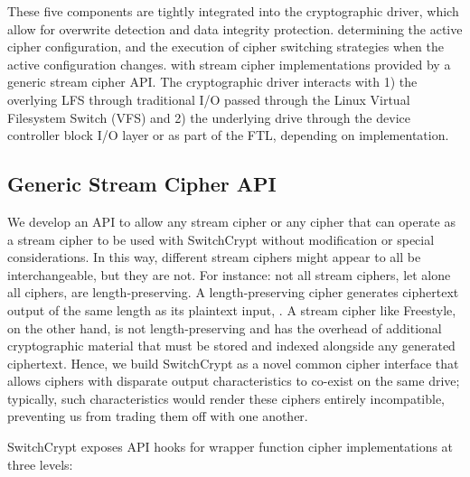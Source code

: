 These five components are tightly integrated into the cryptographic driver,
which allow for overwrite detection and data integrity protection. determining
the active cipher configuration, and the execution of cipher switching
strategies when the active configuration changes. with stream cipher
implementations provided by a generic stream cipher API. The cryptographic
driver interacts with 1) the overlying LFS through traditional I/O passed
through the Linux Virtual Filesystem Switch (VFS) and 2) the underlying drive
through the device controller block I/O layer or as part of the FTL, depending
on implementation.

\subsection{Generic Stream Cipher API}

We develop an API to allow any stream cipher or any cipher that can operate as a
stream cipher to be used with SwitchCrypt without modification or special
considerations. In this way, different stream ciphers might appear to all be
interchangeable, but they are not. For instance: not all stream ciphers, let
alone all ciphers, are length-preserving. A length-preserving cipher generates
ciphertext output of the same length as its plaintext input, . A
stream cipher like Freestyle, on the other hand, is not length-preserving and has the
overhead of additional cryptographic material that must be stored and indexed
alongside any generated ciphertext. Hence, we build SwitchCrypt as a novel common
cipher interface that allows ciphers with disparate output
characteristics to co-exist on the same drive; typically, such characteristics
would render these ciphers entirely incompatible, preventing us from trading
them off with one another.

SwitchCrypt exposes API hooks for wrapper function cipher implementations at three
levels:


